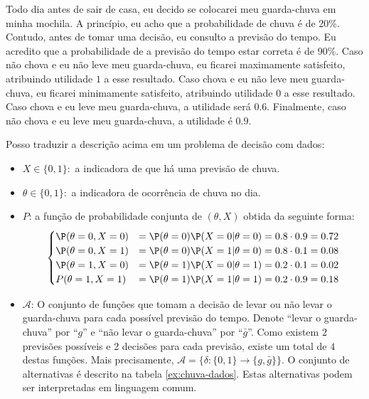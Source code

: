 \begin{example}
 \label{ex:guarda-chuva-dados}
 Todo dia antes de sair de casa,
 eu decido se colocarei meu guarda-chuva em minha mochila.
 A princípio, eu acho que a
 probabilidade de chuva é de 20\%.
 Contudo, antes de tomar uma decisão,
 eu consulto a previsão do tempo.
 Eu acredito que a probabilidade de a
 previsão do tempo estar correta é de 90\%.
 Caso não chova e eu não leve meu guarda-chuva,
 eu ficarei maximamente satisfeito, 
 atribuindo utilidade $1$ a esse resultado.
 Caso chova e eu não leve meu guarda-chuva,
 eu ficarei minimamente satisfeito, 
 atribuindo utilidade $0$ a esse resultado.
 Caso chova e eu leve meu guarda-chuva, 
 a utilidade será $0.6$.
 Finalmente, caso não chova e 
 eu leve meu guarda-chuva, 
 a utilidade é $0.9$.

 Posso traduzir a descrição acima em 
 um problema de decisão com dados:
 \begin{itemize}
  \item $X \in \{0,1\}:$ 
  a indicadora de que há uma previsão de chuva.
  \item $\theta \in \{0,1\}:$ 
  a indicadora de ocorrência de chuva no dia.
  \item $P$: a função de probabilidade conjunta de
  $(\theta,X)$ obtida da seguinte forma:
  \begin{align*}
   \begin{cases}
    \P(\theta=0,X=0)	
    &= \P(\theta=0)\P(X=0|\theta=0)
    = 0.8 \cdot 0.9 = 0.72 \\
	\P(\theta=0,X=1)	
    &= \P(\theta=0)\P(X=1|\theta=0) 
    = 0.8 \cdot 0.1 = 0.08 \\
	\P(\theta=1,X=0)	
    &= \P(\theta=1)\P(X=0|\theta=1) 
    = 0.2 \cdot 0.1 = 0.02 \\
	P(\theta=1,X=1)	
    &= \P(\theta=1)\P(X=1|\theta=1) 
    = 0.2 \cdot 0.9 = 0.18
   \end{cases}
  \end{align*}
  \item $\mathcal{A}$: 
  O conjunto de funções que 
  tomam a decisão de levar ou 
  não levar o guarda-chuva para
  cada possível previsão do tempo.
  Denote ``levar o guarda-chuva'' por ``$g$'' e
  ``não levar o guarda-chuva'' por ``$\bar{g}$''.
  Como existem $2$ previsões possíveis e 
  2 decisões para cada previsão,
  existe um total de $4$ destas funções.
  Mais precisamente, $\mathcal{A} = \{\delta: \{0,1\} \rightarrow \{g,\bar{g}\}\}$.
  O conjunto de alternativas é descrito 
  na tabela \ref{ex:chuva-dados}.
  Estas alternativas podem ser interpretadas 
  em linguagem comum.
										

\end{itemize}
\end{example}
